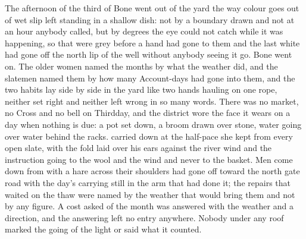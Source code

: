 The afternoon of the third of Bone went out of the yard the way colour goes out of wet slip left standing in a shallow dish: not by a boundary drawn and not at an hour anybody called, but by degrees the eye could not catch while it was happening, so that  were grey before a hand had gone to them and the last white had gone off the north lip of the well without anybody seeing it go. Bone went on. The older women named the months by what the weather did, and the slatemen named them by how many Account-days had gone into them, and the two habits lay side by side in the yard like two hands hauling on one rope, neither set right and neither left wrong in so many words. There was no market, no Cross and no bell on Thirdday, and the district wore the face it wears on a day when nothing is due: a pot set down, a broom drawn over stone, water going over water behind the racks.  carried  down at the half-pace she kept from every open slate, with the fold laid over his ears against the river wind and the instruction going to the wool and the wind and never to the basket. Men come down from  with a hare across their shoulders had gone off toward the north gate road with the day's carrying still in the arm that had done it; the repairs that waited on the thaw were named by the weather that would bring them and not by any figure. A cost asked of the month was answered with the weather and a direction, and the answering left no entry anywhere. Nobody under any roof marked the going of the light or said what it counted.

